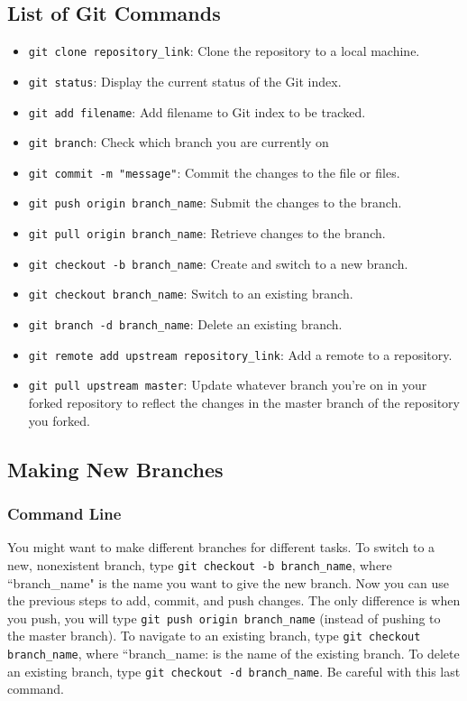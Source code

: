 \documentclass[11pt,a4paper]{article}
\begin{document}
\subsection{List of Git Commands} \label{git-commands}

\begin{itemize}
\item \texttt{git clone repository\_link}: Clone the repository to a local machine.
\item \texttt{git status}: Display the current status of the Git index.
\item \texttt{git add filename}: Add filename to Git index to be tracked.
\item \texttt{git branch}: Check which branch you are currently on
\item \texttt{git commit -m "message"}: Commit the changes to the file or files. 
\item \texttt{git push origin branch\_name}: Submit the changes to the branch.
\item \texttt{git pull origin branch\_name}: Retrieve changes to the branch.
\item \texttt{git checkout -b branch\_name}: Create and switch to a new branch.
\item \texttt{git checkout branch\_name}: Switch to an existing branch.
\item \texttt{git branch -d branch\_name}: Delete an existing branch.
\item \texttt{git remote add upstream repository\_link}: Add a remote to a repository.
\item \texttt{git pull upstream master}: Update whatever branch you're on in your forked repository to reflect the changes in the master branch of the repository you forked.
\end{itemize}

\subsection{Making New Branches}

\subsubsection{Command Line}
You might want to make different branches for different tasks.
To switch to a new, nonexistent branch, type \texttt{git checkout -b branch\_name}, where ``branch\_name" is the name you want to give the new branch.
Now you can use the previous steps to add, commit, and push changes.
The only difference is when you push, you will type \texttt{git push origin branch\_name} (instead of pushing to the master branch).
To navigate to an existing branch, type \texttt{git checkout branch\_name}, where ``branch\_name: is the name of the existing branch.
To delete an existing branch, type \texttt{git checkout -d branch\_name}.
Be careful with this last command.
\end{document}
